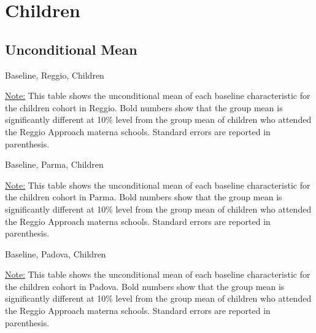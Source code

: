 \documentclass[12pt]{article}
\begin{document}
\appendix

\section{Children}
\subsection{Unconditional Mean}
\begin{table}[H]
\caption{Baseline, Reggio, Children} \label{tab:base-reggio-child}
\scalebox{0.90}{

}
\begin{footnotesize}
\vspace{0.5mm} 

\underline{Note:} This table shows the unconditional mean of each baseline characteristic for the children cohort in Reggio. Bold numbers show that the group mean is significantly different at 10\% level from the group mean of children who attended the Reggio Approach materna schools. Standard errors are reported in parenthesis. 
\end{footnotesize}
\end{table}

\begin{table}[H]
\caption{Baseline, Parma, Children} \label{tab:base-parma-child}
\scalebox{0.85}{

}
\begin{footnotesize}
\vspace{0.5mm} 

\underline{Note:} This table shows the unconditional mean of each baseline characteristic for the children cohort in Parma. Bold numbers show that the group mean is significantly different at 10\% level from the group mean of children who attended the Reggio Approach materna schools. Standard errors are reported in parenthesis. 
\end{footnotesize}
\end{table}

\begin{table}[H]
\caption{Baseline, Padova, Children} \label{tab:base-padova-child}
\scalebox{0.85}{

}
\begin{footnotesize}
\vspace{0.5mm} 

\underline{Note:} This table shows the unconditional mean of each baseline characteristic for the children cohort in Padova. Bold numbers show that the group mean is significantly different at 10\% level from the group mean of children who attended the Reggio Approach materna schools. Standard errors are reported in parenthesis. 
\end{footnotesize}
\end{table}
\end{document}
